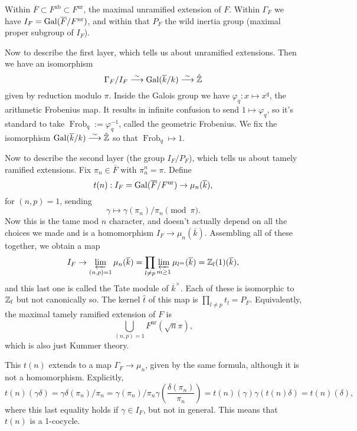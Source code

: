Within $\overline{F} \subset F^{\operatorname{ab}} \subset
F^{\operatorname{ur}}$, the maximal unramified extension of $F$. Within
$\Gamma_F$ we have $I_F = \mathrm{Gal}{(\overline{F} / F^{\operatorname{nr}})}$, and within
that $P_F$ the wild inertia group (maximal proper subgroup of $I_F$).

Now to describe the first layer, which tells us about unramified extensions.
Then we have an isomorphism \[ \Gamma_F/I_F \stackrel{\sim}{\longrightarrow} \mathrm{Gal}{(\overline{k} / k)} \stackrel{\sim}{\longrightarrow}
                              \hat{\mathbb{Z}}\] given by reduction modulo $\pi$.
Inside the Galois group we have $\varphi_q : x \mapsto x^q$, the arithmetic
Frobenius map.  It results in infinite confusion to send $1 \mapsto \varphi_q$,
so it's standard to take $\operatorname{Frob}_q := \varphi_q^{-1}$, called the
geometric Frobenius. We fix the isomorphism $\mathrm{Gal}{(\overline{k} / k)} \stackrel{\sim}{\longrightarrow}
\hat{\mathbb{Z}}$ so that $\operatorname{Frob}_q \mapsto 1$.

Now to describe the second layer (the group $I_F/P_F$), which tells us about
tamely ramified
extensions. Fix $\pi_n \in \overline{F}$ with $\pi_n^n = \pi$. Define
\[ t(n) : I_F = \mathrm{Gal}{(\overline{F} / F^{\operatorname{ur}})} \rightarrow
  \mu_n(\overline{k}), \]
for $(n, p) = 1$, sending
\[ \gamma \mapsto \gamma(\pi_n)/\pi_n \pmod{\pi}. \]
Now this is the tame mod $n$ character, and doesn't actually depend on all the
choices we made and is a homomorphism $I_F \rightarrow \mu_n(\overline{k})$.
Assembling all of these together, we obtain a map
\[ I_F \rightarrow \varprojlim_{(n, p) = 1} \mu_n(\overline{k}) = \prod_{l \neq p}
  \varprojlim_{m \geq 1} \mu_{l^m}(\overline{k}) = \mathbb{Z}_l(1)(\overline{k}), \] and
this last one is called the Tate module of $\overline{k}^\times$. Each of these
is isomorphic to $\mathbb{Z}_l$ but not canonically so. The kernel $\hat{t}$ of this
map is $\prod_{l \neq p} t_l = P_F$. Equivalently, the maximal tamely ramified
extension of $F$ is \[ \bigcup_{(n, p) = 1}
                      F^{\operatorname{nr}}(\sqrt{n}{\pi}), \]
which is also just Kummer theory.

\begin{rmk}
This $t(n)$ extends to a map $\Gamma_F \rightarrow \mu_n$, given by the same
formula, although it is not a homomorphism. Explicitly, \[
t(n)(\gamma \delta) = \gamma \delta(\pi_n)/\pi_n = \gamma(\pi_n)/ \pi_n
\gamma(\dfrac{\delta(\pi_n)}{\pi_n}) = t(n)(\gamma) \gamma(t(n) \delta) =
t(n)(\delta), \] where this last equality holds if $\gamma \in I_F$, but not in
general. This means that $t(n)$ is a 1-cocycle.
\end{rmk}

